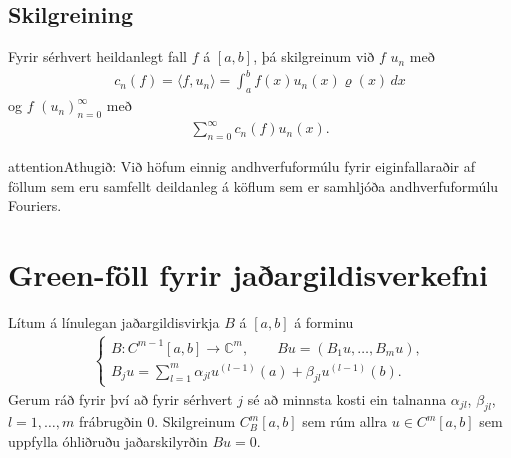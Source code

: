 \documentclass[a4paper,10pt,icelandic]{sphinxmanual}
\begin{document}
\subsection{Skilgreining}
\label{\detokenize{Kafli03:id8}}
Fyrir sérhvert heildanlegt fall \(f\) á \([a,b]\), þá
skilgreinum við  \(f\)   \(u_n\) með
\begin{equation*}
\begin{split}c_n(f)= {{\langle f,u_n\rangle}} =\int_a^b f(x) u_n(x){\varrho}(x)\, dx\end{split}
\end{equation*}
og  \(f\)  
\((u_n)_{n=0}^{\infty}\) með
\begin{equation*}
\begin{split}\sum\limits_{n=0}^{\infty} c_n(f)u_n(x).\end{split}
\end{equation*}
\begin{sphinxadmonition}{attention}{Athugið:}
Við höfum einnig andhverfuformúlu fyrir eiginfallaraðir af föllum sem eru samfellt deildanleg á köflum sem er samhljóða andhverfuformúlu Fouriers.
\end{sphinxadmonition}


\section{Green-föll fyrir jaðargildisverkefni}
\label{\detokenize{Kafli03:green-foll-fyrir-jaargildisverkefni}}
Lítum á línulegan jaðargildisvirkja  \(B\)
á \([a,b]\) á forminu
\begin{equation*}
\begin{split}\begin{cases}
 B:C^{m-1}[a,b]\to {{\mathbb  C}}^m, \qquad Bu=(B_1u,\dots,B_mu),\\
 B_ju=\sum\limits_{l=1}^m \alpha_{jl}u^{(l-1)}(a)+
 \beta_{jl}u^{(l-1)}(b).
 \end{cases}\end{split}
\end{equation*}
Gerum ráð fyrir því að fyrir sérhvert \(j\) sé að minnsta kosti
ein talnanna \(\alpha_{jl}\), \(\beta_{jl}\),
\(l=1,\dots,m\) frábrugðin \(0\). Skilgreinum \(C^m_B[a,b]\)
sem rúm allra \(u\in C^m[a,b]\) sem uppfylla óhliðruðu
jaðarskilyrðin \(Bu=0\).
\end{document}
